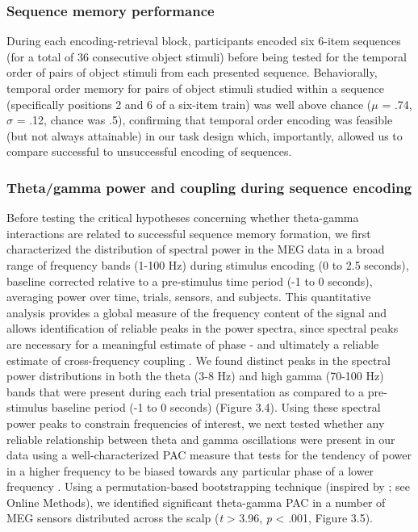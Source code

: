 \subsubsection{Sequence memory
performance}\label{sequence-memory-performance}

During each encoding-retrieval block, participants encoded six 6-item
sequences (for a total of 36 consecutive object stimuli) before being
tested for the temporal order of pairs of object stimuli from each
presented sequence. Behaviorally, temporal order memory for pairs of
object stimuli studied within a sequence (specifically positions 2 and 6
of a six-item train) was well above chance (\(\mu\) = .74, \(\sigma\) =
.12, chance was .5), confirming that temporal order encoding was
feasible (but not always attainable) in our task design which,
importantly, allowed us to compare successful to unsuccessful encoding
of sequences.

\subsubsection{Theta/gamma power and coupling during sequence
encoding}\label{thetagamma-power-and-coupling-during-sequence-encoding}

Before testing the critical hypotheses concerning whether theta-gamma
interactions are related to successful sequence memory formation, we
first characterized the distribution of spectral power in the MEG data
in a broad range of frequency bands (1-100 Hz) during stimulus encoding
(0 to 2.5 seconds), baseline corrected relative to a pre-stimulus time
period (-1 to 0 seconds), averaging power over time, trials, sensors,
and subjects. This quantitative analysis provides a global measure of
the frequency content of the signal and allows identification of
reliable peaks in the power spectra, since spectral peaks are necessary
for a meaningful estimate of phase - and ultimately a reliable estimate
of cross-frequency coupling \autocite{aru_untangling_2015}. We found
distinct peaks in the spectral power distributions in both the theta
(3-8 Hz) and high gamma (70-100 Hz) bands that were present during each
trial presentation as compared to a pre-stimulus baseline period (-1 to
0 seconds) (Figure 3.4). Using these spectral power peaks to constrain
frequencies of interest, we next tested whether any reliable
relationship between theta and gamma oscillations were present in our
data using a well-characterized PAC measure that tests for the tendency
of power in a higher frequency to be biased towards any particular phase
of a lower frequency
\autocites{tort_measuring_2010}{tort_thetagamma_2009}. Using a
permutation-based bootstrapping technique (inspired by
\textcite{canolty_high_2006}; see Online Methods), we identified
significant theta-gamma PAC in a number of MEG sensors distributed
across the scalp (\emph{t} \textgreater{} 3.96, \emph{p} \textless{}
.001, Figure 3.5).

